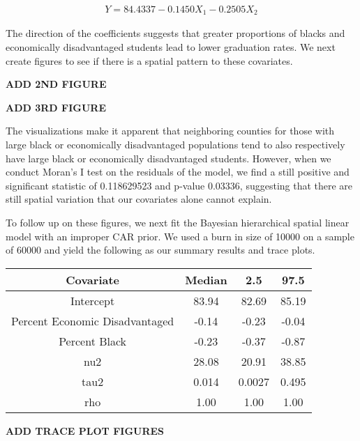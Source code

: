 \documentclass[12pt,letterpaper]{article}
\begin{document}
\begin{align*}\label{eq:pareto mle2}
Y = 84.4337 - 0.1450X_1           -0.2505X_2
\end{align*}

The direction of the coefficients suggests that greater proportions of blacks and economically disadvantaged students lead to lower graduation rates. We next create figures to see if there is a spatial pattern to these covariates.  
\begin{center}
\LARGE\textbf{ADD 2ND FIGURE}
\end{center}

\begin{center}
\LARGE\textbf{ADD 3RD FIGURE}
\end{center}

The visualizations make it apparent that neighboring counties for those with large black or economically disadvantaged populations tend to also respectively have large black or economically disadvantaged students. However, when we conduct Moran's I test on the residuals of the model, we find a still positive and significant statistic of 0.118629523 and p-value 0.03336, suggesting that there are still spatial variation that our covariates alone cannot explain. 


To follow up on these figures, we next fit the Bayesian hierarchical spatial linear model with an improper CAR prior. We used a burn in size of 10000 on a sample of 60000 and yield the following as our summary results and trace plots.

\begin{center}
 \begin{tabular}{||c c c c||} 
 \hline
 Covariate & Median & 2.5 & 97.5 \\ [0.5ex] 
 \hline\hline
 Intercept & 83.94 & 82.69 & 85.19 \\ 
 \hline
 Percent Economic Disadvantaged & -0.14 & -0.23 & -0.04 \\
 \hline
 Percent Black & -0.23 & -0.37 & -0.87 \\
 \hline
 nu2 & 28.08 & 20.91 & 38.85 \\
 \hline
 tau2 & 0.014 & 0.0027 & 0.495 \\ 
\hline
 rho & 1.00 &1.00 & 1.00 \\ [0.5ex] 
 \hline
\end{tabular}
\end{center}

\begin{center}
\LARGE\textbf{ADD TRACE PLOT FIGURES}
\end{center}
\end{document}
